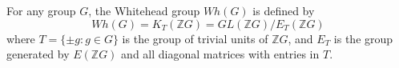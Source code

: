 For any group $G$, the Whitehead group $Wh(G)$ is defined by
$$Wh(G) = K_T(\mathbb{Z}G) = GL(\mathbb{Z}G) / E_T(\mathbb{Z}G)$$
where $T = \{\pm g : g \in G\}$ is the group of trivial units of $\mathbb{Z}G$, and $E_T$ is the group generated by $E(\mathbb{Z}G)$ and all diagonal matrices with entries in $T$.
